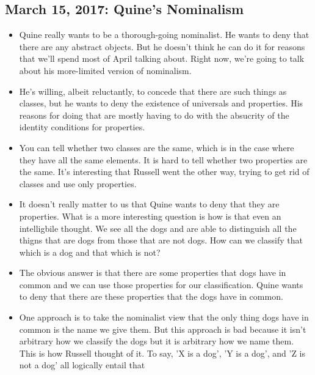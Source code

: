 \documentclass[12pt]{article}
\theoremstyle{definition}
\begin{document}
\begin{itemize}
\end{itemize}

\subsection{March 15, 2017: Quine's Nominalism}

\begin{itemize}
    \itemsep0em 
    \item 
        Quine really wants to be a thorough-going nominalist. He wants to deny
        that there are any abstract objects. But he doesn't think he can do it
        for reasons that we'll spend most of April talking about. Right now,
        we're going to talk about his more-limited version of nominalism. 
    \item
        He's willing, albeit reluctantly, to concede that there are such things
        as classes, but he wants to deny the existence of universals and
        properties. His reasons for doing that are mostly having to do with the
        absucrity of the identity conditions for properties.
    \item
        You can tell whether two classes are the same, which is in the case
        where they have all the same elements. It is hard to tell whether two
        properties are the same. It's interesting that Russell went the other
        way, trying to get rid of classes and use only properties.
    \item
        It doesn't really matter to us that Quine wants to deny that they are
        properties. What is a more interesting question is how is that even an
        intelligbile thought. We see all the dogs and are able to distinguish
        all the thigns that are dogs from those that are not dogs. How can we
        classify that which is a dog and that which is not? 
    \item
        The obvious answer is that there are some properties that dogs have in
        common and we can use those properties for our classification. Quine
        wants to deny that there are these properties that the dogs have in
        common. 
    \item
        One approach is to take the nominalist view that the only thing dogs
        have in common is the name we give them. But this approach is bad
        because it isn't arbitrary how we classify the dogs but it is arbitrary
        how we name them. This is how Russell thought of it. To say, 'X is a
        dog', 'Y is a dog', and 'Z is not a dog' all logically entail that

\end{itemize}
\end{document}
